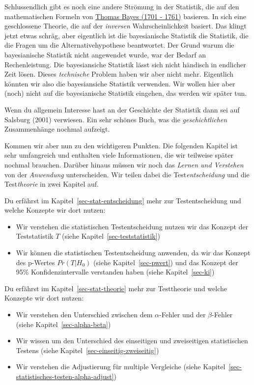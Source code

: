 \documentclass[
  letterpaper,
]{scrbook}
\providecommand{\tightlist}{%
  \setlength{\itemsep}{0pt}\setlength{\parskip}{0pt}}\usepackage{longtable,booktabs,array}
\begin{document}
Schlussendlich gibt es noch eine andere Strömung in der Statistik, die
auf den mathematischen Formeln von
\href{https://en.wikipedia.org/wiki/Thomas_Bayes}{Thomas Bayes (1701 -
1761)} basieren. In sich eine geschlossene Theorie, die auf der
\emph{inversen} Wahrscheinlichkeit basiert. Das klingt jetzt etwas
schräg, aber eigentlich ist die bayesianische Statistik die Statistik,
die die Fragen um die Alternativehypothese beantwortet. Der Grund warum
die bayesianische Statistik nicht angewendet wurde, war der Bedarf an
Rechenleistung. Die bayesiansiche Statistik lässt sich nicht händisch in
endlicher Zeit lösen. Dieses \emph{technische} Problem haben wir aber
nicht mehr. Eigentlich könnten wir also die bayesiansiche Statistik
verwenden. Wir wollen hier aber (noch) nicht auf die bayesianische
Statistik eingehen, das werden wir später tun.

Wenn du allgemein Interesse hast an der Geschichte der Statistik dann
sei auf Salsburg (2001) verwiesen. Ein sehr schönes Buch, was die
\emph{geschichtlichen} Zusammenhänge nochmal aufzeigt.

Kommen wir aber nun zu den wichtigeren Punkten. Die folgenden Kapitel
ist sehr umfangreich und enthalten viele Informationen, die wir
teilweise später nochmal brauchen. Darüber hinaus müssen wir noch das
\emph{Lernen und Verstehen} von der \emph{Anwendung} unterscheiden. Wir
teilen dabei die Test\emph{entscheidung} und die Test\emph{theorie} in
zwei Kapitel auf.

Du erfährst im Kapitel~\ref{sec-stat-entscheidung} mehr zur
Testentscheidung und welche Konzepte wir dort nutzen:

\begin{itemize}
\tightlist
\item
  Wir verstehen die statistischen Testentscheidung nutzen wir das
  Konzept der Teststatistik \(T\) (siehe
  Kapitel~\ref{sec-teststatistik})
\item
  Wir können die statistischen Testentscheidung anwenden, da wir das
  Konzept des p-Wertes \(Pr(T|H_0)\) (siehe Kapitel~\ref{sec-pwert}) und
  das Konzept der 95\% Konfidenzintervalle verstanden haben (siehe
  Kapitel~\ref{sec-ki})
\end{itemize}

Du erfährst im Kapitel~\ref{sec-stat-theorie} mehr zur Testtheorie und
welche Konzepte wir dort nutzen:

\begin{itemize}
\tightlist
\item
  Wir verstehen den Unterschied zwischen dem \(\alpha\)-Fehler und der
  \(\beta\)-Fehler (siehe Kapitel~\ref{sec-alpha-beta})
\item
  Wir wissen um den Unterschied des einseitigen und zweiseitigen
  statistischen Testens (siehe Kapitel~\ref{sec-einseitig-zweiseitig})
\item
  Wir verstehen die Adjustierung für multiple Vergleiche (siehe
  Kapitel~\ref{sec-statistisches-testen-alpha-adjust})
\end{itemize}
\end{document}
